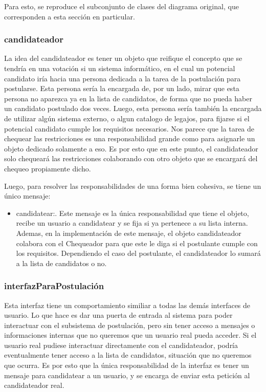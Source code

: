 Para esto, se reproduce el subconjunto de clases del diagrama original, que corresponden a esta secci\'on en particular.




\subsubsection{candidateador}

La idea del candidateador es tener un objeto que reifique el concepto que se tendr\'ia en una votaci\'on si un sistema inform\'atico, en el cual un potencial candidato ir\'ia hacia una persona dedicada a la tarea de la postulaci\'on para postularse. Esta persona ser\'ia la encargada de, por un lado, mirar que esta persona no aparezca ya en la lista de candidatos, de forma que no pueda haber un candidato postulado dos veces. Luego, esta persona ser\'ia tambi\'en la encargada de utilizar alg\'un sistema externo, o algun catalogo de legajos, para fijarse si el potencial candidato cumple los requisitos necesarios. Nos parece que la tarea de chequear las restricciones es una responsabilidad grande como para asignarle un objeto dedicado solamente a eso. Es por esto que en este punto, el candidateador solo chequear\'a las restricciones colaborando con otro objeto que se encargar\'a del chequeo propiamente dicho.

Luego, para resolver las responsabilidades de una forma bien cohesiva, se tiene un \'unico mensaje:

\begin{itemize}
\item candidatear:. Este mensaje es la \'unica responsabilidad que tiene el objeto, recibe un usuario a candidatear y se fija si ya pertenece a su lista interna. Ademas, en la implementaci\'on de este mensaje, el objeto candidateador colabora con el Chequeador para que este le diga si el postulante cumple con los requisitos. Dependiendo el caso del postulante, el candidateador lo sumar\'a a la lista de candidatos o no.
\end{itemize}


\subsubsection{interfazParaPostulaci\'on}

Esta interfaz tiene un comportamiento similiar a todas las dem\'as interfaces de usuario. Lo que hace es dar una puerta de entrada al sistema para poder interactuar con el subsistema de postulaci\'on, pero sin tener acceso a mensajes o informaciones internas que no queremos que un usuario real pueda acceder. Si el usuario real pudiese interactuar directamente con el candidateador, podr\'ia eventualmente tener acceso a la lista de candidatos, situaci\'on que no queremos que ocurra. Es por esto que la \'unica responsabilidad de la interfaz es tener un mensaje para candidatear a un usuario, y se encarga de enviar esta petici\'on al candidateador real.


